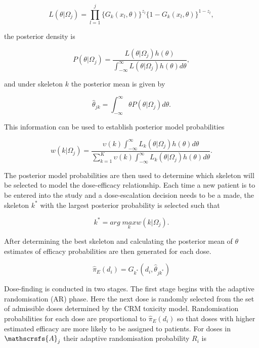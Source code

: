 \begin{equation}
	L(\theta|\Omega_j)=\prod_{l=1}^{j}\{G_k(x_l,\theta)\}^{z_l}\{1-G_k(x_l,\theta)\}^{1-z_l},  
\end{equation}

the posterior density is 

\begin{equation}
	P(\theta|\Omega_j) = \frac{L(\theta|\Omega_j)h(\theta)}{\int_{-\infty}^{\infty}L(\theta|\Omega_j)h(\theta)d\theta},
\end{equation}

and under skeleton $k$ the posterior mean is given by 

\begin{equation}
	\hat{\theta}_{jk} = \int_{-\infty}^{\infty}\theta P(\theta|\Omega_j)d\theta.
\end{equation} 

This information can be used to establish posterior model probabilities 

\begin{equation}
	w(k|\Omega_j) = \frac{\upsilon(k)\int_{-\infty}^{\infty}L_k(\theta|\Omega_j)h(\theta)d\theta}{\sum_{k=1}^{K}\upsilon(k)\int_{-\infty}^{\infty}L_k(\theta|\Omega_j)h(\theta)d\theta}.
\end{equation}

The posterior model probabilities are then used to determine which skeleton will be selected to model the dose-efficacy relationship. Each time a new patient is to be entered into the study and a dose-escalation decision needs to be a made, the skeleton $k^*$ with the largest posterior probability is selected such that

\begin{equation}
	k^* = arg \; \underset{k}{max}w(k|\Omega_j).
\end{equation}

After determining the best skeleton and calculating the posterior mean of $\theta$ estimates of efficacy probabilities are then generated for each dose. 

\begin{equation}
	\hat{\pi}_E(d_i) = G_{k^*} (d_i, \hat{\theta}_{jk^*})
\end{equation}

Dose-finding is conducted in two stages. The first stage begins with the adaptive randomisation (AR) phase. Here the next dose is randomly selected from the set of admissible doses determined by the CRM toxicity model. Randomisation probabilities for each dose are proportional to $\hat{\pi}_E(d_i)$ so that doses with higher estimated efficacy are more likely to be assigned to patients. For doses in $\mathscrsfs{A}_j$ their adaptive randomisation probability $R_i$ is 

